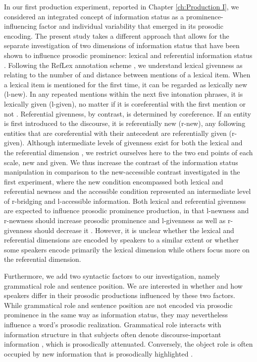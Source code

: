 In our first production experiment, reported in Chapter \ref{ch:Production I}, we considered an integrated concept of information status as a prominence-influencing factor and individual variability that emerged in its prosodic encoding. The present study takes a different approach that allows for the separate investigation of two dimensions of information status that have been shown to influence prosodic prominence: lexical and referential information status \citep{baumannReferentialLexicalGivenness2012, baumannCoreferenceLexicalGivenness2013, riesterRefLexSchemeAnnotation2017}. Following the RefLex annotation scheme \citep{riesterRefLexSchemeAnnotation2017}, we understand lexical givenness as relating to the number of and distance between mentions of a lexical item. When a lexical item is mentioned for the first time, it can be regarded as lexically new (l-new). In any repeated mentions within the next five intonation phrases, it is lexically given (l-given), no matter if it is coreferential with the first mention or not \citep[24]{baumannCoreferenceLexicalGivenness2013}. Referential givenness, by contrast, is determined by coreference. If an entity is first introduced to the discourse, it is referentially new (r-new), any following entities that are coreferential with their antecedent are referentially given (r-given). Although intermediate levels of givenness exist for both the lexical and the referential dimension \citep[e.g.,][]{riesterRefLexSchemeAnnotation2017}, we restrict ourselves here to the two end points of each scale, new and given. We thus increase the contrast of the information status manipulation in comparison to the new-accessible contrast investigated in the first experiment, where the new condition encompassed both lexical and referential newness and the accessible condition represented an intermediate level of r-bridging and l-accessible information. Both lexical and referential givenness are expected to influence prosodic prominence production, in that l-newness and r-newness should increase prosodic prominence and l-givenness as well as r-givenness should decrease it \citep{baumannReferentialLexicalGivenness2012, baumannCoreferenceLexicalGivenness2013}. However, it is unclear whether the lexical and referential dimensions are encoded by speakers to a similar extent or whether some speakers encode primarily the lexical dimension while others focus more on the referential dimension. 

Furthermore, we add two syntactic factors to our investigation, namely grammatical role and sentence position. We are interested in whether and how speakers differ in their prosodic productions influenced by these two factors. While grammatical role and sentence position are not encoded via prosodic prominence in the same way as information status, they may nevertheless influence a word's prosodic realization. Grammatical role interacts with information structure in that subjects often denote discourse-important information \citep{arnoldReferenceFormDiscourse1998}, which is prosodically attenuated. Conversely, the object role is often occupied by new information that is prosodically highlighted \citep{hallidayNotesTransitivityTheme1967, terkenDeaccentuationWordsRepresenting1994}.

